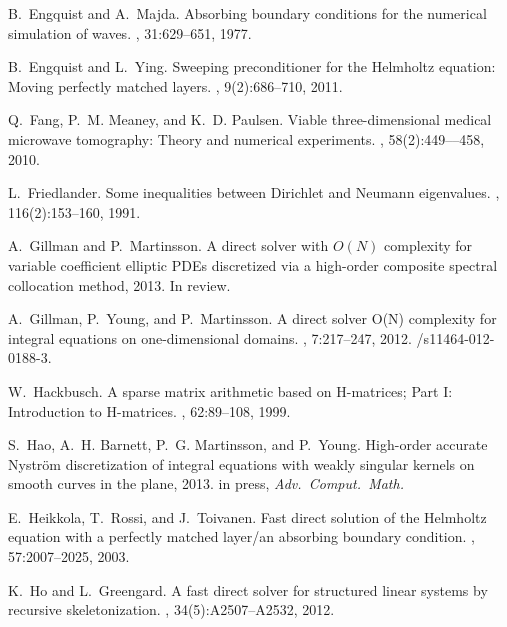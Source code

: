 \documentclass[11pt,final]{amsart}
\theoremstyle{definition}
\numberwithin{remark}{section}
\numberwithin{definition}{section}
\numberwithin{pro}{section}
\begin{document}
\begin{thebibliography}{}
B.~Engquist and A.~Majda.
\newblock Absorbing boundary conditions for the numerical simulation of waves.
, 31:629--651, 1977.

B.~Engquist and L.~Ying.
\newblock Sweeping preconditioner for the {H}elmholtz equation: Moving
  perfectly matched layers.
, 9(2):686--710, 2011.

Q.~Fang, P.~M. Meaney, and K.~D. Paulsen.
\newblock Viable three-dimensional medical microwave tomography: Theory and
  numerical experiments.
, 58(2):449–--458, 2010.

L.~Friedlander.
\newblock Some inequalities between {D}irichlet and {N}eumann eigenvalues.
, 116(2):153--160, 1991.

A.~Gillman and P.~Martinsson.
\newblock A direct solver with {$O(N)$} complexity for variable coefficient
  elliptic {PDE}s discretized via a high-order composite spectral collocation
  method, 2013.
\newblock In review.

A.~Gillman, P.~Young, and P.~Martinsson.
\newblock A direct solver {O(N)} complexity for integral equations on
  one-dimensional domains.
, 7:217--247, 2012.
/s11464-012-0188-3.

W.~Hackbusch.
\newblock A sparse matrix arithmetic based on {H}-matrices; {P}art {I}:
  {I}ntroduction to {H}-matrices.
, 62:89--108, 1999.

S.~Hao, A.~H. Barnett, P.~G. Martinsson, and P.~Young.
\newblock High-order accurate {Nystr\"om} discretization of integral equations
  with weakly singular kernels on smooth curves in the plane, 2013.
\newblock in press, {\it Adv.\ Comput.\ Math.}

E.~Heikkola, T.~Rossi, and J.~Toivanen.
\newblock Fast direct solution of the {H}elmholtz equation with a perfectly
  matched layer/an absorbing boundary condition.
, 57:2007--2025, 2003.

K.~Ho and L.~Greengard.
\newblock A fast direct solver for structured linear systems by recursive
  skeletonization.
, 34(5):A2507--A2532, 2012.


\end{thebibliography}
\end{document}
